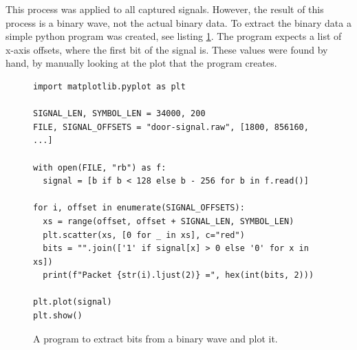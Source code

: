 This process was applied to all captured signals. However, the result of this process is a binary wave, not the actual binary data. To extract the binary data a simple python program was created, see listing \ref{lst:extract-bits}. The program expects a list of x-axis offsets, where the first bit of the signal is. These values were found by hand, by manually looking at the plot that the program creates.
\begin{figure}[ht]
    \begin{verbatim}
import matplotlib.pyplot as plt

SIGNAL_LEN, SYMBOL_LEN = 34000, 200
FILE, SIGNAL_OFFSETS = "door-signal.raw", [1800, 856160, ...]

with open(FILE, "rb") as f:
  signal = [b if b < 128 else b - 256 for b in f.read()]

for i, offset in enumerate(SIGNAL_OFFSETS):
  xs = range(offset, offset + SIGNAL_LEN, SYMBOL_LEN)
  plt.scatter(xs, [0 for _ in xs], c="red")
  bits = "".join(['1' if signal[x] > 0 else '0' for x in xs])
  print(f"Packet {str(i).ljust(2)} =", hex(int(bits, 2)))

plt.plot(signal)
plt.show()
    \end{verbatim}
    \caption{A program to extract bits from a binary wave and plot it.}
    \label{lst:extract-bits}
\end{figure}

